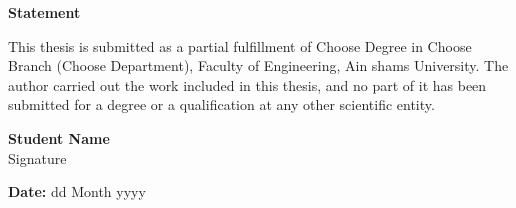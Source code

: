 \cleardoublepage
\setlength{\thesignaturewidth}{2cm}
\newpage
\thispagestyle{empty}
\begin{center}\huge\textbf{Statement}\end{center}
\Large
\vfill
This thesis is submitted as a partial fulfillment of Choose Degree in Choose Branch (Choose Department), Faculty of Engineering, Ain shams University.
The author carried out the work included in this thesis, and no part of it has been submitted for a degree or a qualification at any other scientific entity. 







\vfill
\begin{flushright}
\large
\textbf{Student Name} \\

\small
Signature \\
\dotfill \hspace{0.1\thesignaturewidth}

\textbf{Date:} dd Month yyyy \\
\end{flushright}
\vfill

\normalsize
